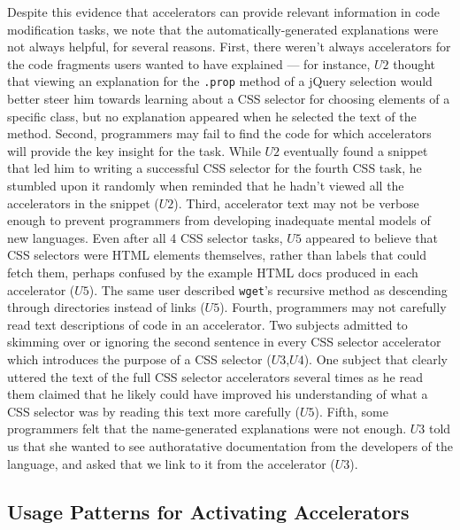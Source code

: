 Despite this evidence that accelerators can provide relevant information in code modification tasks, we note that the automatically-generated explanations were not always helpful, for several reasons.
First, there weren't always accelerators for the code fragments users wanted to have explained --- for instance, $U2$ thought that viewing an explanation for the \texttt{.prop} method of a jQuery selection would better steer him towards learning about a CSS selector for choosing elements of a specific class, but no explanation appeared when he selected the text of the method.
Second, programmers may fail to find the code for which accelerators will provide the key insight for the task.
While $U2$ eventually found a snippet that led him to writing a successful CSS selector for the fourth CSS task, he stumbled upon it randomly when reminded that he hadn't viewed all the accelerators in the snippet ($U2$).
Third, accelerator text may not be verbose enough to prevent programmers from developing inadequate mental models of new languages.
Even after all 4 CSS selector tasks, $U5$ appeared to believe that CSS selectors were HTML elements themselves, rather than labels that could fetch them, perhaps confused by the example HTML docs produced in each accelerator ($U5$).
The same user described \texttt{wget}'s recursive method as descending through directories instead of links ($U5$).
Fourth, programmers may not carefully read text descriptions of code in an accelerator.
Two subjects admitted to skimming over or ignoring the second sentence in every CSS selector accelerator which introduces the purpose of a CSS selector ($U3$,$U4$).
One subject that clearly uttered the text of the full CSS selector accelerators several times as he read them claimed that he likely could have improved his understanding of what a CSS selector was by reading this text more carefully ($U5$).
Fifth, some programmers felt that the \gls{name}-generated explanations were not enough.
$U3$ told us that she wanted to see authoratative documentation from the developers of the language, and asked that we link to it from the accelerator ($U3$).

\subsection{Usage Patterns for Activating Accelerators}

